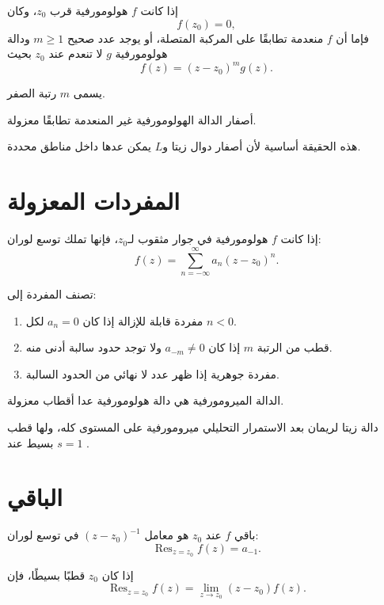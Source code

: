 إذا كانت \(f\) هولومورفية قرب \(z_0\)، وكان
\[
f(z_0)=0,
\]
فإما أن \(f\) منعدمة تطابقًا على المركبة المتصلة، أو يوجد عدد صحيح \(m\geq1\) ودالة هولومورفية \(g\) لا تنعدم عند \(z_0\) بحيث
\[
f(z)=(z-z_0)^m g(z).
\]

يسمى \(m\) رتبة الصفر.

\begin{corollary}
\label{cor:isolated-zeros}
أصفار الدالة الهولومورفية غير المنعدمة تطابقًا معزولة.
\end{corollary}

هذه الحقيقة أساسية لأن أصفار دوال زيتا و\(L\) يمكن عدها داخل مناطق محددة.

\section{المفردات المعزولة}

إذا كانت \(f\) هولومورفية في جوار مثقوب لـ\(z_0\)، فإنها تملك توسع لوران:
\[
f(z)=\sum_{n=-\infty}^{\infty}a_n(z-z_0)^n.
\]

تصنف المفردة إلى:

\begin{enumerate}
  \item مفردة قابلة للإزالة إذا كان \(a_n=0\) لكل \(n<0\).
  \item قطب من الرتبة \(m\) إذا كان \(a_{-m}\neq0\) ولا توجد حدود سالبة أدنى منه.
  \item مفردة جوهرية إذا ظهر عدد لا نهائي من الحدود السالبة.
\end{enumerate}

\begin{definition}
الدالة الميرومورفية هي دالة هولومورفية عدا أقطاب معزولة.
\end{definition}

دالة زيتا لريمان بعد الاستمرار التحليلي ميرومورفية على المستوى كله،
ولها قطب بسيط عند \(s=1\) \cite{Titchmarsh1986}.

\section{الباقي}

\begin{definition}
باقي \(f\) عند \(z_0\) هو معامل \((z-z_0)^{-1}\) في توسع لوران:
\[
\operatorname{Res}_{z=z_0}f(z)=a_{-1}.
\]
\end{definition}

إذا كان \(z_0\) قطبًا بسيطًا، فإن
\[
\operatorname{Res}_{z=z_0}f(z)
=
\lim_{z\to z_0}(z-z_0)f(z).
\]

